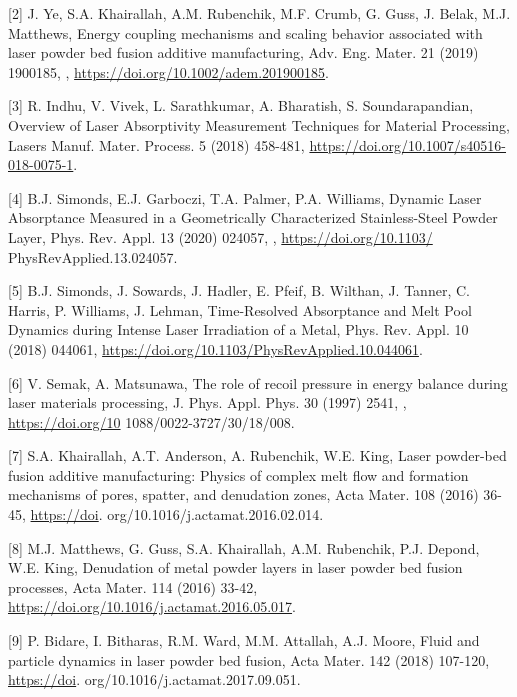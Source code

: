 \documentclass[10pt]{article}
\begin{document}
[2] J. Ye, S.A. Khairallah, A.M. Rubenchik, M.F. Crumb, G. Guss, J. Belak, M.J. Matthews, Energy coupling mechanisms and scaling behavior associated with laser powder bed fusion additive manufacturing, Adv. Eng. Mater. 21 (2019) 1900185, , \href{https://doi.org/10.1002/adem.201900185}{https://doi.org/10.1002/adem.201900185}.

[3] R. Indhu, V. Vivek, L. Sarathkumar, A. Bharatish, S. Soundarapandian, Overview of Laser Absorptivity Measurement Techniques for Material Processing, Lasers Manuf. Mater. Process. 5 (2018) 458-481, \href{https://doi.org/10.1007/s40516-018-0075-1}{https://doi.org/10.1007/s40516-018-0075-1}.

[4] B.J. Simonds, E.J. Garboczi, T.A. Palmer, P.A. Williams, Dynamic Laser Absorptance Measured in a Geometrically Characterized Stainless-Steel Powder Layer, Phys. Rev. Appl. 13 (2020) 024057, , \href{https://doi.org/10.1103/}{https://doi.org/10.1103/} PhysRevApplied.13.024057.

[5] B.J. Simonds, J. Sowards, J. Hadler, E. Pfeif, B. Wilthan, J. Tanner, C. Harris, P. Williams, J. Lehman, Time-Resolved Absorptance and Melt Pool Dynamics during Intense Laser Irradiation of a Metal, Phys. Rev. Appl. 10 (2018) 044061, \href{https://doi.org/10.1103/PhysRevApplied.10.044061}{https://doi.org/10.1103/PhysRevApplied.10.044061}.

[6] V. Semak, A. Matsunawa, The role of recoil pressure in energy balance during laser materials processing, J. Phys. Appl. Phys. 30 (1997) 2541, , \href{https://doi.org/10}{https://doi.org/10} 1088/0022-3727/30/18/008.

[7] S.A. Khairallah, A.T. Anderson, A. Rubenchik, W.E. King, Laser powder-bed fusion additive manufacturing: Physics of complex melt flow and formation mechanisms of pores, spatter, and denudation zones, Acta Mater. 108 (2016) 36-45, \href{https://doi}{https://doi}. org/10.1016/j.actamat.2016.02.014.

[8] M.J. Matthews, G. Guss, S.A. Khairallah, A.M. Rubenchik, P.J. Depond, W.E. King, Denudation of metal powder layers in laser powder bed fusion processes, Acta Mater. 114 (2016) 33-42, \href{https://doi.org/10.1016/j.actamat.2016.05.017}{https://doi.org/10.1016/j.actamat.2016.05.017}.

[9] P. Bidare, I. Bitharas, R.M. Ward, M.M. Attallah, A.J. Moore, Fluid and particle dynamics in laser powder bed fusion, Acta Mater. 142 (2018) 107-120, \href{https://doi}{https://doi}. org/10.1016/j.actamat.2017.09.051.
\end{document}
